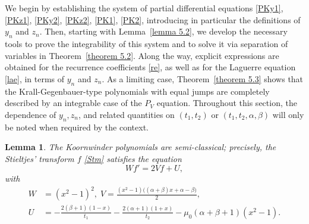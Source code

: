 \documentclass[10pt, reqno]{amsart}
\numberwithin{equation}{section}
\newtheorem{lemma}{Lemma}[section]
\numberwithin{equation}{section}
\begin{document}
We begin by establishing the system of partial differential equations \eqref{PKy1}, \eqref{PKz1}, \eqref{PKy2}, \eqref{PKz2}, \eqref{PK1}, \eqref{PK2}, introducing in particular the definitions of $y_n$ and $z_n$. Then, starting with Lemma~\ref{lemma 5.2}, we develop the necessary tools to prove the integrability of this system and to solve it via separation of variables in Theorem~\ref{theorem 5.2}. Along the way, explicit expressions are obtained for the recurrence coefficients \eqref{re}, as well as for the Laguerre equation \eqref{lae}, in terms of $y_n$ and $z_n$. As a limiting case, Theorem~\ref{theorem 5.3} shows that the Krall-Gegenbauer-type polynomials with equal jumps are completely described by an integrable case of the $P_V$ equation. Throughout this section, the dependence of $y_n, z_n$, and related quantities on $(t_1,t_2)$ or $(t_1, t_2, \alpha, \beta)$ will only be noted when required by the context.
\begin{lemma} \label{lemma 5.1}
The Koornwinder polynomials are semi-classical; precisely, the Stieltjes' transform $f$ \eqref{Stm} satisfies the equation
\begin{equation} \label{scKK1}
Wf'=2Vf+U,
\end{equation}
with
\begin{align}
W&=(x^2-1)^2,\; V=\frac{(x^2-1)\big((\alpha+\beta)x+\alpha-\beta\big)}{2},\nonumber\\
U&=-\frac{2(\beta+1)(1-x)}{t_1}-\frac{2(\alpha+1)(1+x)}{t_2}-\mu_0(\alpha+\beta+1)(x^2-1).\label{scKK2}
\end{align}
\end{lemma}
\end{document}

